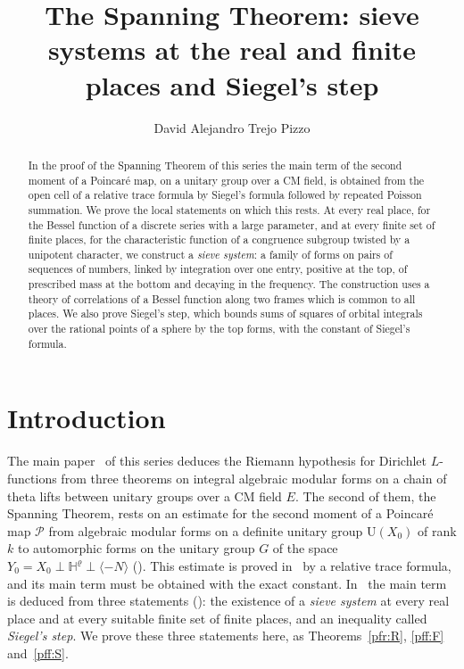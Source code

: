 \documentclass[10pt]{amsart}
\theoremstyle{definition}
\theoremstyle{remark}
\providecommand{\auP}{\mathcal P}
\providecommand{\auU}{\mathrm U}
\begin{document}
\addtolength{\abovedisplayskip}{-3.4pt}
\addtolength{\belowdisplayskip}{-3.4pt}
\addtolength{\belowdisplayshortskip}{-2pt}
\title[The Spanning Theorem: local computations]{The Spanning Theorem: sieve systems at the real and finite places and Siegel's step}
\author{David Alejandro Trejo Pizzo}
\date{}
\begin{abstract}
In the proof of the Spanning Theorem of this series the main term of the second moment of a
Poincar\'e map, on a unitary group over a CM field, is obtained from the open cell of a relative
trace formula by Siegel's formula followed by repeated Poisson summation. We prove the local
statements on which this rests. At every real place, for the Bessel function of a discrete series
with a large parameter, and at every finite set of finite places, for the characteristic function
of a congruence subgroup twisted by a unipotent character, we construct a \emph{sieve system}: a
family of forms on pairs of sequences of numbers, linked by integration over one entry, positive
at the top, of prescribed mass at the bottom and decaying in the frequency. The construction uses
a theory of correlations of a Bessel function along two frames which is common to all places. We
also prove Siegel's step, which bounds sums of squares of orbital integrals over the rational
points of a sphere by the top forms, with the constant of Siegel's formula.
\end{abstract}
\maketitle
\setcounter{tocdepth}{1}\tableofcontents

\section{Introduction}\label{B2:intro}

The main paper~\cite{P46} of this series deduces the Riemann hypothesis for Dirichlet
$L$-functions from three theorems on integral algebraic modular forms on a chain of theta lifts
between unitary groups over a CM field $E$. The second of them, the Spanning Theorem, rests on an
estimate for the second moment of a Poincar\'e map $\auP$ from algebraic modular forms on a
definite unitary group $\auU(X_0)$ of rank $k$ to automorphic forms on the unitary group $G$ of
the space $Y_0=X_0\perp\mathbb H^{\varrho}\perp\langle-N\rangle$ ({\cite[Proposition~14.32]{P46}}).
This estimate is proved in~\cite{P51} by a relative trace formula, and its main term must be
obtained with the exact constant. In~\cite{P51} the main term is deduced from three statements
({\cite[Theorem~3.51]{P51}}): the existence of a \emph{sieve system} at every real place and at
every suitable finite set of finite places, and an inequality called \emph{Siegel's step}. We prove
these three statements here, as Theorems~\ref{pfr:R}, \ref{pff:F}
and~\ref{pff:S}.
\end{document}
